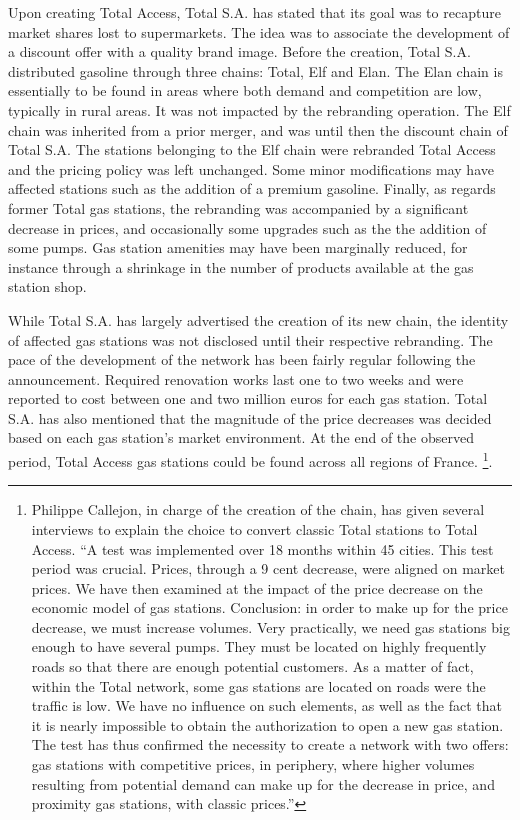 \documentclass[english]{article}
\begin{document}
Upon creating Total Access, Total S.A. has stated that its goal was to recapture market shares lost to supermarkets. The idea was to associate the development of a discount offer with a quality brand image. Before the creation, Total S.A. distributed gasoline through three chains: Total, Elf and Elan. The Elan chain is essentially to be found in areas where both demand and competition are low, typically in rural areas. It was not impacted by the rebranding operation. The Elf chain was inherited from a prior merger, and was until then the discount chain of Total S.A. The stations belonging to the Elf chain were rebranded Total Access and the pricing policy was left unchanged. Some minor modifications may have affected stations such as the addition of a premium gasoline. Finally, as regards former Total gas stations, the rebranding was accompanied by a significant decrease in prices, and occasionally some upgrades such as the the addition of some pumps. Gas station amenities may have been marginally reduced, for instance through a shrinkage in the number of products available at the gas station shop.

While Total S.A. has largely advertised the creation of its new chain, the identity of affected gas stations was not disclosed until their respective rebranding. The pace of the development of the network has been fairly regular following the announcement. Required renovation works last one to two weeks and were reported to cost between one and two million euros for each gas station. Total S.A. has also mentioned that the magnitude of the price decreases was decided based on each gas station's market environment. At the end of the observed period, Total Access gas stations could be found across all regions of France.%
\footnote{Philippe Callejon, in charge of the creation of the chain, has given several interviews to explain the choice to convert classic Total stations to Total Access. ``A test was implemented over 18 months within 45 cities. This test period was crucial. Prices, through a 9 cent decrease, were aligned on market prices. We have then examined at the impact of the price decrease on the economic model of gas stations. Conclusion: in order to make up for the price decrease, we must increase volumes. Very practically, we need gas stations big enough to have several pumps. They must be located on highly frequently roads so that there are enough potential customers. As a matter of fact, within the Total network, some gas stations are located on roads were the traffic is low. We have no influence on such elements, as well as the fact that it is nearly impossible to obtain the authorization to open a new gas station. The test has thus confirmed the necessity to create a network with two offers: gas stations with competitive prices, in periphery, where higher volumes resulting from potential demand can make up for the decrease in price, and proximity gas stations, with classic prices.''%
}.
\end{document}
